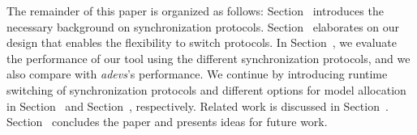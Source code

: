 The remainder of this paper is organized as follows:
Section~\textsc{} introduces the necessary background on synchronization protocols.
Section~\textsc{} elaborates on our design that enables the flexibility to switch protocols.
In Section~\textsc{}, we evaluate the performance of our tool using the different synchronization protocols, and we also compare with \textit{adevs}'s performance.
We continue by introducing runtime switching of synchronization protocols and different options for model allocation in Section~\textsc{} and Section~\textsc{}, respectively.
Related work is discussed in Section~\textsc{}.
Section~\textsc{} concludes the paper and presents ideas for future work.
